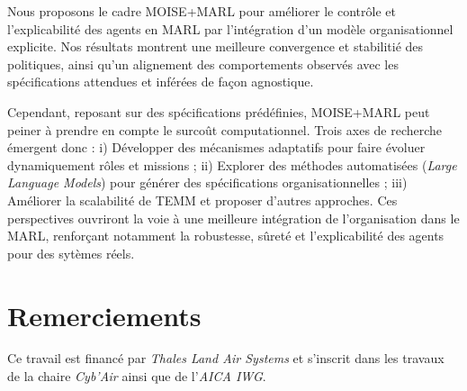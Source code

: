 \documentclass[dissemination]{jfsma}
\begin{document}
Nous proposons le cadre MOISE+MARL pour améliorer le contrôle et l'explicabilité des agents en MARL par l'intégration d'un modèle organisationnel explicite. Nos résultats montrent une meilleure convergence et stabilitié des politiques, ainsi qu'un alignement des comportements observés avec les spécifications attendues et inférées de façon agnostique.

Cependant, reposant sur des spécifications prédéfinies, MOISE+MARL peut peiner à prendre en compte le surcoût computationnel.
%
Trois axes de recherche émergent donc :
i) Développer des mécanismes adaptatifs pour faire évoluer dynamiquement rôles et missions
; \quad
ii) Explorer des méthodes automatisées (\textit{Large Language Models}) pour générer des spécifications organisationnelles
 ; \quad
iii) Améliorer la scalabilité de TEMM et proposer d'autres approches.
%
Ces perspectives ouvriront la voie à une meilleure intégration de l'organisation dans le MARL, renforçant notamment la robustesse, sûreté et l'explicabilité des agents pour des sytèmes réels.

\section*{Remerciements}

Ce travail est financé par \emph{Thales Land Air Systems} et s'inscrit dans les travaux de la chaire \emph{Cyb'Air} ainsi que de l'\emph{AICA IWG}.

\renewcommand{\bibname}{}


\begin{myCustomSize}

\end{myCustomSize}
\end{document}
